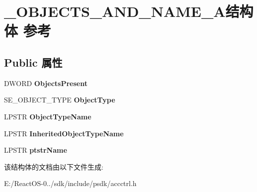 \hypertarget{struct___o_b_j_e_c_t_s___a_n_d___n_a_m_e___a}{}\section{\+\_\+\+O\+B\+J\+E\+C\+T\+S\+\_\+\+A\+N\+D\+\_\+\+N\+A\+M\+E\+\_\+\+A结构体 参考}
\label{struct___o_b_j_e_c_t_s___a_n_d___n_a_m_e___a}
\subsection*{Public 属性}
\begin{DoxyCompactItemize}
\item 
\mbox{\label{struct___o_b_j_e_c_t_s___a_n_d___n_a_m_e___a_a748a9630917b7ca5924580dae1842a1e}} 
D\+W\+O\+RD {\bfseries Objects\+Present}
\item 
\mbox{\label{struct___o_b_j_e_c_t_s___a_n_d___n_a_m_e___a_ab76642159a50c5d463e67a14f9882043}} 
S\+E\+\_\+\+O\+B\+J\+E\+C\+T\+\_\+\+T\+Y\+PE {\bfseries Object\+Type}
\item 
\mbox{\label{struct___o_b_j_e_c_t_s___a_n_d___n_a_m_e___a_a0e42eeac85fcb1f354b8dd9133da553c}} 
L\+P\+S\+TR {\bfseries Object\+Type\+Name}
\item 
\mbox{\label{struct___o_b_j_e_c_t_s___a_n_d___n_a_m_e___a_a9fe5f0e5a4df021d153ee8a7dc31bf30}} 
L\+P\+S\+TR {\bfseries Inherited\+Object\+Type\+Name}
\item 
\mbox{\label{struct___o_b_j_e_c_t_s___a_n_d___n_a_m_e___a_a71cd18c128f38f5b12f08ca44411ade0}} 
L\+P\+S\+TR {\bfseries ptstr\+Name}
\end{DoxyCompactItemize}


该结构体的文档由以下文件生成\+:\begin{DoxyCompactItemize}
\item 
E\+:/\+React\+O\+S-\/0../sdk/include/psdk/accctrl.\+h\end{DoxyCompactItemize}
